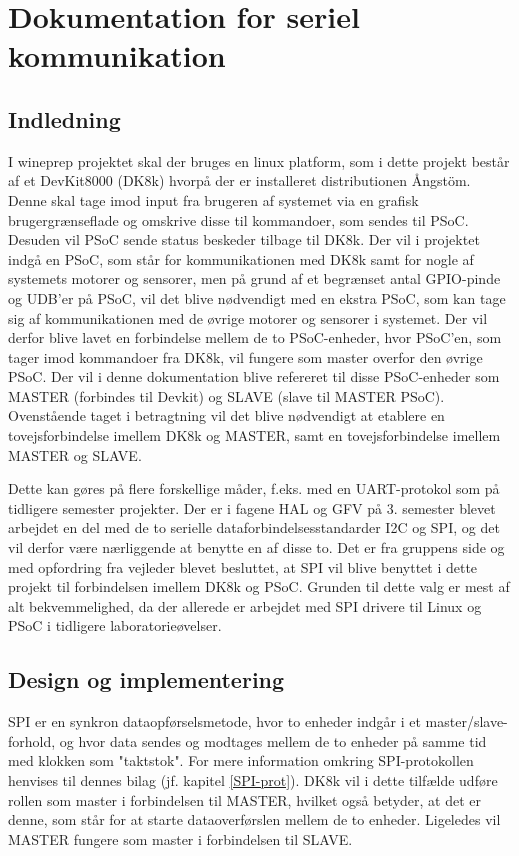 \chapter{Dokumentation for seriel kommunikation}

\section{Indledning}
I wineprep projektet skal der bruges en linux platform, som i dette projekt består af et DevKit8000 (DK8k) hvorpå der er installeret distributionen Ångstöm. 
Denne skal tage imod input fra brugeren af systemet via en grafisk brugergrænseflade og omskrive disse til kommandoer, som sendes til PSoC. Desuden
vil PSoC sende status beskeder tilbage til DK8k.
Der vil i projektet indgå en PSoC, som står for kommunikationen med DK8k samt for nogle af systemets motorer og sensorer,
men på grund af et begrænset antal GPIO-pinde og UDB'er på PSoC, vil det blive nødvendigt med en ekstra PSoC, som kan tage sig af kommunikationen med de 
øvrige motorer og sensorer i systemet. Der vil derfor blive lavet en forbindelse mellem de to PSoC-enheder, hvor PSoC'en, som tager imod kommandoer fra
DK8k, vil fungere som master overfor den øvrige PSoC. Der vil i denne dokumentation blive refereret til disse PSoC-enheder som MASTER
(forbindes til Devkit) og SLAVE (slave til MASTER PSoC). 
Ovenstående taget i betragtning vil det blive nødvendigt at etablere en tovejsforbindelse imellem DK8k og MASTER, samt en tovejsforbindelse imellem 
MASTER og SLAVE. 

Dette kan gøres på flere forskellige måder, f.eks. med en UART-protokol som på tidligere semester projekter. Der er i fagene HAL og GFV på 3. semester 
blevet arbejdet en del med de to serielle dataforbindelsesstandarder I2C og SPI, og det vil derfor være nærliggende at benytte en af disse to. 
Det er fra gruppens side og med opfordring fra vejleder blevet besluttet, at SPI vil blive benyttet i dette projekt til forbindelsen imellem DK8k og 
PSoC. Grunden til dette valg er mest af alt bekvemmelighed, da der allerede er arbejdet med SPI drivere til Linux og PSoC i tidligere laboratorieøvelser.   

\section{Design og implementering}
SPI er en synkron dataopførselsmetode, hvor to enheder indgår i et master/slave-forhold, og hvor data sendes og modtages mellem de to enheder på
samme tid med klokken som "taktstok". For mere information omkring SPI-protokollen henvises til dennes bilag (jf. kapitel \ref{SPI-prot}).
DK8k vil i dette tilfælde udføre rollen som master i forbindelsen til MASTER, hvilket også betyder, at det er denne, som står for at starte 
dataoverførslen mellem de to enheder. Ligeledes vil MASTER fungere som master i forbindelsen til SLAVE.

